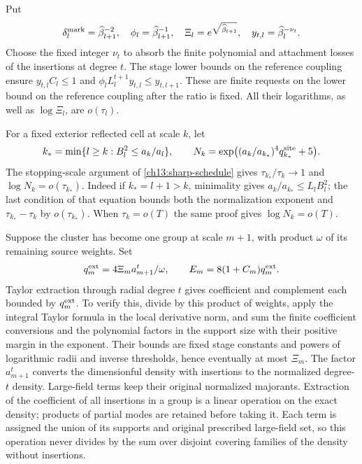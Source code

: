 Put
\[
 \delta_l^{\rm mark}=\widehat\beta_{l+1}^{-2},\quad
 \phi_l=\widehat\beta_{l+1}^{-1},\quad
 \Xi_l=e^{\sqrt{\widehat\beta_{l+1}}},\quad
 y_{t,l}=\widehat\beta_l^{-\nu_t}.
\]
Choose the fixed integer $\nu_t$ to absorb the finite polynomial and
attachment losses of the insertions at degree $t$. The stage lower bounds on the reference coupling ensure
$y_{t,l}C_l\le1$ and
$\phi_l L_l^{t+1}y_{t,l}\le y_{t,l+1}$.
These are finite requests on the lower bound on the reference coupling after the ratio is fixed.
All their logarithms, as well as $\log\Xi_l$, are $o(\tau_l)$.

For a fixed exterior reflected cell at scale $k$, let
\[
 k_* =\min\{l\ge k:B_l^2\le a_k/a_l\},\qquad
 N_k=\exp\bigl((a_k/a_{k_*})^4q_{k_*}^{\rm site}+5\bigr).
\]
The stopping-scale argument of
\eqref{ch13:sharp-schedule} gives $\tau_{k_*}/\tau_k\to1$
and $\log N_k=o(\tau_{k_*})$. Indeed if $k_*=l+1>k$,
minimality gives $a_k/a_{k_*}\le L_lB_l^2$; the last condition
of that equation bounds both the normalization exponent and
$\tau_{k_*}-\tau_k$ by $o(\tau_{k_*})$.
When $\tau_k=o(T)$ the same proof gives $\log N_k=o(T)$.

Suppose the cluster has become one group at scale $m+1$, with
product $\omega$ of its remaining source weights. Set
\[
 q_m^{\rm ext}=4\Xi_ma_{m+1}^t/\omega,\qquad
                    E_m=8(1+C_m)q_m^{\rm ext}.
\]
Taylor extraction through radial degree $t$ gives coefficient and
complement each bounded by $q_m^{\rm ext}$. To verify this, divide
by this product of weights, apply the integral Taylor formula in the
local derivative norm, and sum the finite coefficient conversions
and the polynomial factors in the support size with their positive margin in the exponent. Their
bounds are fixed stage constants and powers of logarithmic radii
and inverse thresholds, hence eventually at most $\Xi_m$.
The factor $a_{m+1}^t$ converts the dimensionful density with insertions to the
normalized degree-$t$ density. Large-field terms keep their
original normalized majorants. Extraction of the coefficient of
all insertions in a group is a linear operation on the exact density;
products of partial modes are retained before taking it. Each
term is assigned the union of its supports and original prescribed large-field set,
so this operation never divides by the sum over disjoint covering families of the density without insertions.

